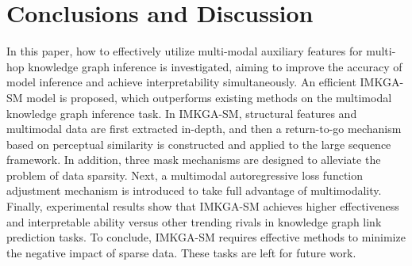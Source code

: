\documentclass[10pt,journal,compsoc]{IEEEtran}
\begin{document}
\section{Conclusions and Discussion}
In this paper, how to effectively utilize multi-modal auxiliary features for multi-hop knowledge graph inference is investigated, aiming to improve the accuracy of model inference and achieve interpretability simultaneously. An efficient IMKGA-SM model is proposed, which outperforms existing methods on the multimodal knowledge graph inference task. In IMKGA-SM, structural features and multimodal data are first extracted in-depth, and then a return-to-go mechanism based on perceptual similarity is constructed and applied to the large sequence framework. In addition, three mask mechanisms are designed to alleviate the problem of data sparsity. Next, a multimodal autoregressive loss function adjustment mechanism is introduced to take full advantage of multimodality. Finally, experimental results show that IMKGA-SM achieves higher effectiveness and interpretable ability versus other trending rivals in knowledge graph link prediction tasks. To conclude, IMKGA-SM requires effective methods to minimize the negative impact of sparse data. These tasks are left for future work.









% 

\end{document}
